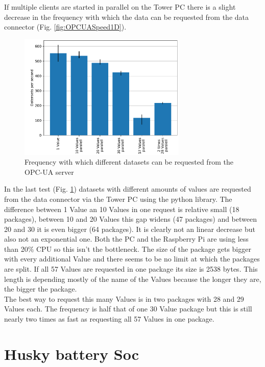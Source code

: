 \documentclass[conference]{IEEEtran}
\begin{document}
If multiple clients are started in parallel on the Tower PC there is a slight decrease in the frequency with which the data can be requested from the data connector (Fig. \ref{fig:OPCUASpeed1D}).
\begin{figure}[htbp]
    \centerline{\includegraphics[width=8cm]{Pictures/OPCUAMultipleDatenAufEinmal.pdf}}
    \caption{Frequency with which different datasets can be requested from the OPC-UA server}
    \label{fig:OPCUAMultipleDatenAufEinmal}
\end{figure}
In the last test (Fig. \ref{fig:OPCUAMultipleDatenAufEinmal}) datasets with different amounts of values are requested from the data connector via the Tower PC using the python library.
The difference between 1 Value an 10 Values in one request is relative small (18 packages), between 10 and 20 Values this gap widens (47 packages) and between 20 and 30 it is even bigger (64 packages).
It is clearly not an linear decrease but also not an exponential one. 
Both the PC and the Raspberry Pi are using less than 20\% CPU so this isn't the bottleneck.
The size of the package gets bigger with every additional Value and there seems to be no limit at which the packages are split.
If all 57 Values are requested in one package its size is 2538 bytes.
This length is depending mostly of the name of the Values because the longer they are, the bigger the package.\\
The best way to request this many Values is in two packages with 28 and 29 Values each.
The frequency is half that of one 30 Value package but this is still nearly two times as fast as requesting all 57 Values in one package.
\section{Husky battery Soc}
\end{document}
